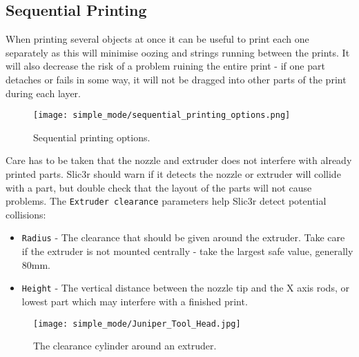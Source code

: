 
\subsection{Sequential Printing} %
\label{sec:sequential_printing}

When printing several objects at once it can be useful to print each one separately as this will minimise oozing and strings running between the prints.  It will also decrease the risk of a problem ruining the entire print - if one part detaches or fails in some way, it will not be dragged into other parts of the print during each layer.

\begin{figure}[H]
\centering
\texttt{[image: simple\_mode/sequential\_printing\_options.png]}
\caption{Sequential printing options.}
\label{fig:sequential_printing_options}
\end{figure}

Care has to be taken that the nozzle and extruder does not interfere with already printed parts.  Slic3r should warn if it detects the nozzle or extruder will collide with a part, but double check that the layout of the parts will not cause problems.  The \texttt{Extruder clearance} parameters help Slic3r detect potential collisions:
\begin{itemize}
	\item \texttt{Radius}  - The clearance that should be given around the extruder.  Take care if the extruder is not mounted centrally - take the largest safe value, generally 80mm.
	\item \texttt{Height}  - The vertical distance between the nozzle tip and the X axis rods, or lowest part which may interfere with a finished print.
\end{itemize}

\begin{figure}[H]
\centering
\texttt{[image: simple\_mode/Juniper\_Tool\_Head.jpg]}
\caption{The clearance cylinder around an extruder.}
\label{fig:a_diagram_depicting_extruder_clearance}
\end{figure}

